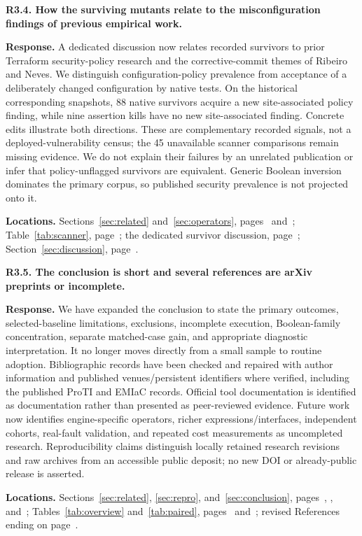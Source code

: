 \medskip
\noindent\textbf{R3.4. How the surviving mutants relate to the misconfiguration findings of previous empirical work.}\label{response:R3.4}\par
\textbf{Response.} A dedicated discussion now relates recorded survivors to prior Terraform security-policy research and the corrective-commit themes of Ribeiro and Neves. We distinguish configuration-policy prevalence from acceptance of a deliberately changed configuration by native tests. On the historical corresponding snapshots, 88 native survivors acquire a new site-associated policy finding, while nine assertion kills have no new site-associated finding. Concrete edits illustrate both directions. These are complementary recorded signals, not a deployed-vulnerability census; the 45 unavailable scanner comparisons remain missing evidence. We do not explain their failures by an unrelated publication or infer that policy-unflagged survivors are equivalent. Generic Boolean inversion dominates the primary corpus, so published security prevalence is not projected onto it.\par
\textbf{Locations.} Sections~\ref{sec:related} and~\ref{sec:operators}, pages~\pageref{sec:related} and~\pageref{sec:operators}; Table~\ref{tab:scanner}, page~\pageref{tab:scanner}; the dedicated survivor discussion, page~\pageref{sec:survivorcontext}; Section~\ref{sec:discussion}, page~\pageref{sec:discussion}.

\medskip
\noindent\textbf{R3.5. The conclusion is short and several references are arXiv preprints or incomplete.}\label{response:R3.5}\par
\textbf{Response.} We have expanded the conclusion to state the primary outcomes, selected-baseline limitations, exclusions, incomplete execution, Boolean-family concentration, separate matched-case gain, and appropriate diagnostic interpretation. It no longer moves directly from a small sample to routine adoption. Bibliographic records have been checked and repaired with author information and published venues/persistent identifiers where verified, including the published ProTI and EMIaC records. Official tool documentation is identified as documentation rather than presented as peer-reviewed evidence. Future work now identifies engine-specific operators, richer expressions/interfaces, independent cohorts, real-fault validation, and repeated cost measurements as uncompleted research. Reproducibility claims distinguish locally retained research revisions and raw archives from an accessible public deposit; no new DOI or already-public release is asserted.\par
\textbf{Locations.} Sections~\ref{sec:related}, \ref{sec:repro}, and~\ref{sec:conclusion}, pages~\pageref{sec:related}, \pageref{sec:repro}, and~\pageref{sec:conclusion}; Tables~\ref{tab:overview} and~\ref{tab:paired}, pages~\pageref{tab:overview} and~\pageref{tab:paired}; revised References ending on page~\pageref{lastmanuscriptpage}.


